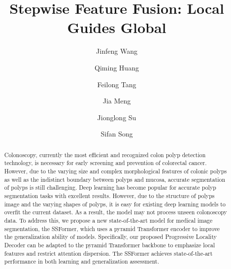 \documentclass[runningheads]{llncs}
\begin{document}

\title{Stepwise Feature Fusion: Local Guides Global}

\author{Jinfeng Wang \and
Qiming Huang\inst{1\footnotemark[1]} \and
Feilong Tang\inst{1\footnotemark[1]} \and Jia Meng \and Jionglong Su \and Sifan Song} 



\maketitle
{}


\begin{abstract}
Colonoscopy, currently the most efficient and recognized colon polyp detection technology, is necessary for early screening and prevention of colorectal cancer. However, due to the varying size and complex morphological features of colonic polyps as well as the indistinct boundary between polyps and mucosa, accurate segmentation of polyps is still challenging. Deep learning has become popular for accurate polyp segmentation tasks with excellent results. However, due to the structure of polyps image and the varying shapes of polyps, it is easy for existing deep learning models to overfit the current dataset. As a result, the model may not process unseen colonoscopy data. To address this, we propose a new state-of-the-art model for medical image segmentation, the SSFormer, which uses a pyramid Transformer encoder to improve the generalization ability of models. Specifically, our proposed Progressive Locality Decoder can be adapted to the pyramid Transformer backbone to emphasize local features and restrict attention dispersion. The SSFormer achieves state-of-the-art performance in both learning and generalization assessment. 

\end{abstract}
\end{document}
